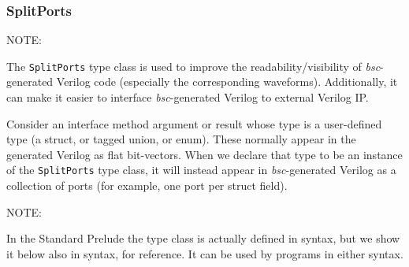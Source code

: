 
\subsubsection{SplitPorts}

\label{sec-SplitPorts-typeclass}


NOTE: \hfill {}

The {\tt SplitPorts} type class is used to improve the
readability/visibility of \emph{bsc}-generated Verilog code
(especially the corresponding waveforms).  Additionally, it can make
it easier to interface \emph{bsc}-generated Verilog to external
Verilog IP.

Consider an interface method argument or result whose type is a
user-defined type (a struct, or tagged union, or enum).  These
normally appear in the generated Verilog as flat bit-vectors.  When we
declare that type to be an instance of the {\tt SplitPorts} type
class, it will instead appear in \emph{bsc}-generated Verilog as a
collection of ports (for example, one port per struct field).

NOTE: \hfill {}

\vspace{1ex}

In the Standard Prelude the type class is actually defined in {\BHb}
syntax, but we show it below also in {\BSVb} syntax, for reference.
It can be used by programs in either syntax.


